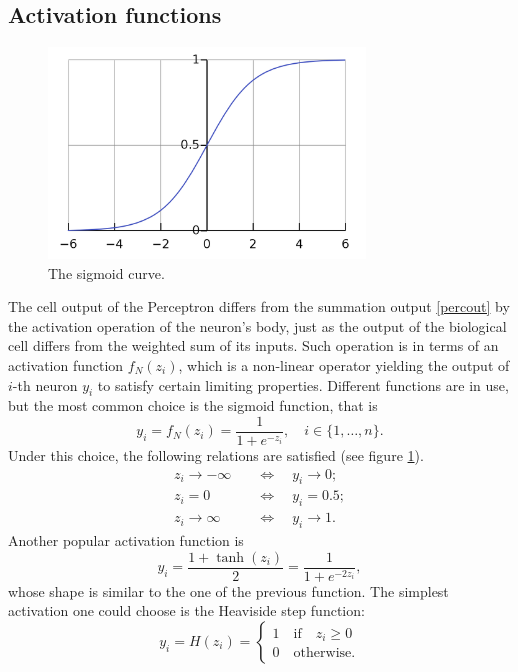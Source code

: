 \documentclass[%
    corpo=11pt,
    twoside,
    stile=classica,
    oldstyle,
    autoretitolo,
    tipotesi=magistrale,
    greek,
    evenboxes,
    english
]{toptesi}
\begin{document}
\subsection{Activation functions}
\label{percact}
\begin{figure}[h]
\centering
\includegraphics[width=0.75\textwidth]{pictures/sigmoid.png}
\caption{The sigmoid curve.}
\label{fig:sigmoid}
\end{figure}
The cell output of the Perceptron differs from the summation output \ref{percout} by the activation operation of the neuron's body, just as the output of the biological cell differs from the weighted sum of its inputs. Such operation is in terms of an activation function $f_N(z_i)$, which is a non-linear operator yielding the output of $i$-th neuron $y_i$ to satisfy certain limiting properties. Different functions are in use, but the most common choice is the sigmoid function, that is
\begin{equation}
\label{act-sigmoid}
y_i = f_N(z_i) = \frac{1}{1 + e^{-z_i}}, \quad i \in \{1,\dots,n\}.
\end{equation}
Under this choice, the following relations are satisfied (see figure \ref{fig:sigmoid}).
\begin{align*}
z_i \to - \infty \quad &\Longleftrightarrow \quad y_i \to 0 ;\\
z_i = 0 \quad &\Longleftrightarrow \quad y_i = 0.5; \\
z_i \to  \infty \quad &\Longleftrightarrow \quad y_i \to 1.
\end{align*}
Another popular activation function is
\begin{equation}
\label{act-tanh}
y_i = \frac{1 + \tanh(z_i)}{2} = \frac{1}{1 + e^{-2z_i}},
\end{equation}
whose shape is similar to the one of the previous function. The simplest activation one could choose is the Heaviside step function:
\begin{equation*}
y_i = H(z_i) = \begin{cases}
1 \quad \text{if} \quad z_i \geq 0 \\
0 \quad \text{otherwise.}
\end{cases}
\end{equation*}
\end{document}
